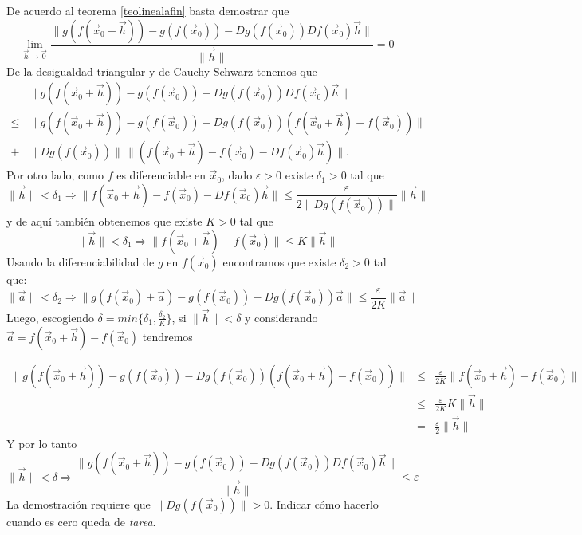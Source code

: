 \begin{demostracion}
De acuerdo al teorema \ref{teolinealafin} basta demostrar que
$$
\lim_{\vec{h}\to \vec{0}}\frac{\|g(f(\vec{x}_0+\vec{h}))-g(f(\vec{x}_0))-Dg(f(\vec{x}_0))Df(\vec{x}_0)\vec{h}\|}{\|\vec{h}\|}=0
$$
De la desigualdad triangular y de Cauchy-Schwarz tenemos que
\begin{align*}
& \|g(f(\vec{x}_0+\vec{h}))-g(f(\vec{x}_0))-Dg(f(\vec{x}_0))Df(\vec{x}_0)\vec{h}\| \\
\leq & \|g(f(\vec{x}_0+\vec{h}))-g(f(\vec{x}_0))-Dg(f(\vec{x}_0))(f(\vec{x}_0+\vec{h})-f(\vec{x}_0))\| \\
+    & \|Dg(f(\vec{x}_0))\|\,\|(f(\vec{x}_0+\vec{h})-f(\vec{x}_0)-Df(\vec{x}_0)\vec{h})\|.
\end{align*}
Por otro lado, como $f$ es diferenciable en $\vec{x}_0$, dado $\varepsilon>0$ 
existe $\delta_1>0$ tal que
$$
\|\vec{h}\|<\delta_1\Rightarrow\|f(\vec{x}_0+\vec{h})-f(\vec{x}_0)-Df(\vec{x}_0)\vec{h}\|\leq\frac{\varepsilon}
{2 \|Dg(f(\vec{x}_0))\|} \|\vec{h}\|$$
y de aqu\'i tambi\'en obtenemos que
 existe $K>0$ tal que
$$\|\vec{h}\|<\delta_1\Rightarrow\|f(\vec{x}_0+\vec{h})-f(\vec{x}_0)\|\leq K\|\vec{h}\|$$
Usando la diferenciabilidad de $g$ en $f(\vec{x}_0)$ encontramos que existe $\delta_2>0$ tal que:
$$\|\vec{a}\|<\delta_2\Rightarrow\|g(f(\vec{x}_0)+\vec{a})-g(f(\vec{x}_0))-Dg(f(\vec{x}_0))\vec{a}\|\leq\frac{\varepsilon}{2K}\|\vec{a}\|$$
Luego, escogiendo $\delta= min\{\delta_1,\frac{\delta_2}{K}\}$, si
$\|\vec{h}\|<\delta$ y considerando $\vec{a}=f(\vec{x}_0+\vec{h})-f(\vec{x}_0)$ tendremos

\begin{eqnarray*}
\|g(f(\vec{x}_0+\vec{h}))-g(f(\vec{x}_0))-Dg(f(\vec{x}_0))(f(\vec{x}_0+\vec{h})-f(\vec{x}_0))\| &\leq& \frac{\varepsilon}{2K} 
\|f(\vec{x}_0+\vec{h})-f(\vec{x}_0)\| \\
&\leq& \frac{\varepsilon}{2K}K\|\vec{h}\| \\
&=& \frac{\varepsilon}{2}\|\vec{h}\|
\end{eqnarray*}
Y por lo tanto
$$\|\vec{h}\|<{\delta}\Rightarrow \frac{\|g(f(\vec{x}_0+\vec{h}))-g(f(\vec{x}_0))-Dg(f(\vec{x}_0))Df(\vec{x}_0)\vec{h}\|}{\|\vec{h}\|} \leq\varepsilon $$
La demostraci\'on requiere que $\|Dg(f(\vec{x}_0))\|>0$. Indicar c\'omo 
hacerlo cuando es cero queda de \emph{tarea}.
\end{demostracion}

